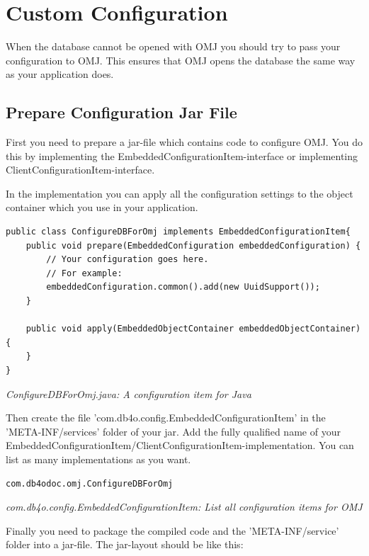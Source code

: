 \section{Custom Configuration}
\label{ref:object-manager-enterprise-ome-for-eclipse-custom-config}

When the database cannot be opened with OMJ you should try to pass your configuration to OMJ. This ensures that OMJ opens the database the same way as your application does.

\subsection*{Prepare Configuration Jar File}

First you need to prepare a jar-file which contains code to configure OMJ. You do this by implementing the EmbeddedConfigurationItem-interface or implementing ClientConfigurationItem-interface.

In the implementation you can apply all the configuration settings to the object container which you use in your application.

\begin{lstlisting}
public class ConfigureDBForOmj implements EmbeddedConfigurationItem{
    public void prepare(EmbeddedConfiguration embeddedConfiguration) {
        // Your configuration goes here.
        // For example:
        embeddedConfiguration.common().add(new UuidSupport());
    }

    public void apply(EmbeddedObjectContainer embeddedObjectContainer) {
    }
}
\end{lstlisting}

{\small\itshape ConfigureDBForOmj.java: A configuration item for Java\par}
\medskip

Then create the file 'com.db4o.config.EmbeddedConfigurationItem' in the 'META-INF/services' folder of your jar. Add the fully qualified name of your EmbeddedConfigurationItem/ClientConfigurationItem-implementation. You can list as many implementations as you want.

\begin{lstlisting}
com.db4odoc.omj.ConfigureDBForOmj
\end{lstlisting}

{\small\itshape com.db4o.config.EmbeddedConfigurationItem: List all configuration items for OMJ\par}
\medskip

Finally you need to package the compiled code and the 'META-INF/service' folder into a jar-file. The jar-layout should be like this:

